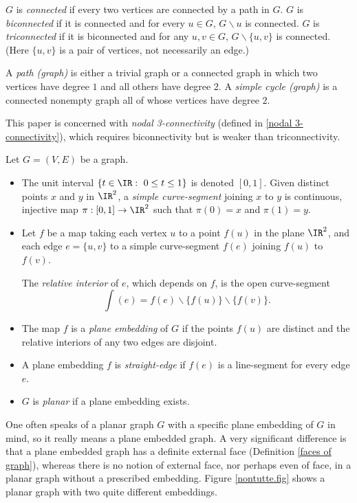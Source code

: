 $G$ is {\em connected} if every two vertices are connected
by a path in $G$.
$G$ is {\em biconnected} if it is
connected and for every $u\in G$, $G\backslash u$ is connected.
$G$ is {\em triconnected} if it is biconnected and
for any $u,v\in G$, $G\backslash \{u,v\}$ is connected.
(Here $\{u,v\}$ is a pair of vertices, not necessarily
an edge.)

A {\em path (graph)} is either a trivial graph or
a connected graph in which two vertices have degree $1$ and all
others have degree $2$.
A {\em simple cycle (graph)} is a connected nonempty graph all of
whose vertices have degree $2$.

This paper is concerned with {\em nodal 3-connectivity}
(defined in \ref{nodal 3-connectivity}),
which requires biconnectivity but is weaker
than triconnectivity.

\begin{definition}
\label{planar graph defined} Let $G = (V,E)$ be a graph.
\begin{itemize}
\item
The unit interval $\{t \in \IR:~ 0 \leq t \leq 1\}$
is denoted $[0,1]$.
Given distinct points $x$ and $y$ in $\IR^2$,
a {\em simple curve-segment} joining $x$ to $y$ is
continuous, injective map $\pi: [0,1] \to \IR^2$
such that $\pi(0) = x$ and $\pi(1) = y.$
\item
Let $f$ be a map taking
each vertex $u$ to a point $f(u)$ in the plane $\IR^2$,
and each edge $e=\{u,v\}$ to a simple curve-segment
$f(e)$ joining $f(u)$ to $f(v)$.

The {\em relative interior} of $e$, which depends on $f$,
is the open curve-segment
$$ \int(e) = f(e) \backslash \{f(u)\} \backslash \{f(v)\}.$$

\item
The map $f$ is a {\em plane embedding} of $G$ if the points
$f(u)$ are distinct and the relative interiors of any two
edges are disjoint.

\item
A plane embedding $f$ is {\em straight-edge} if $f(e)$ is
a line-segment for every edge $e$.
\item
$G$ is {\em planar} if a plane embedding exists.
\end{itemize}
\end{definition}

One often speaks of a planar graph $G$ with a specific
plane embedding of $G$ in mind, so it really means a
plane embedded graph.  A very significant difference is
that a plane embedded graph has a definite external face
(Definition \ref{faces of graph}),
whereas there is no notion of external face, nor
perhaps even of face, in a planar graph without a prescribed
embedding.
Figure \ref{nontutte.fig} shows a planar graph with two
quite different embeddings.

